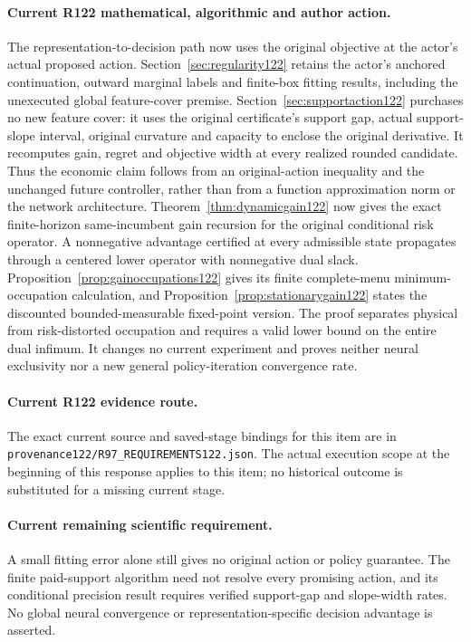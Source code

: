 \paragraph{Current R122 mathematical, algorithmic and author action.}
The representation-to-decision path now uses the original objective at the actor's actual proposed action. Section~\ref{sec:regularity122} retains the actor's anchored continuation, outward marginal labels and finite-box fitting results, including the unexecuted global feature-cover premise. Section~\ref{sec:supportaction122} purchases no new feature cover: it uses the original certificate's support gap, actual support-slope interval, original curvature and capacity to enclose the original derivative. It recomputes gain, regret and objective width at every realized rounded candidate. Thus the economic claim follows from an original-action inequality and the unchanged future controller, rather than from a function approximation norm or the network architecture. Theorem~\ref{thm:dynamicgain122} now gives the exact finite-horizon same-incumbent gain recursion for the original conditional risk operator. A nonnegative advantage certified at every admissible state propagates through a centered lower operator with nonnegative dual slack. Proposition~\ref{prop:gainoccupations122} gives its finite complete-menu minimum-occupation calculation, and Proposition~\ref{prop:stationarygain122} states the discounted bounded-measurable fixed-point version. The proof separates physical from risk-distorted occupation and requires a valid lower bound on the entire dual infimum. It changes no current experiment and proves neither neural exclusivity nor a new general policy-iteration convergence rate.
\paragraph{Current R122 evidence route.}
The exact current source and saved-stage bindings for this item are in \nolinkurl{provenance122/R97_REQUIREMENTS122.json}. The actual execution scope at the beginning of this response applies to this item; no historical outcome is substituted for a missing current stage.
\paragraph{Current remaining scientific requirement.}
A small fitting error alone still gives no original action or policy guarantee. The finite paid-support algorithm need not resolve every promising action, and its conditional precision result requires verified support-gap and slope-width rates. No global neural convergence or representation-specific decision advantage is asserted.

